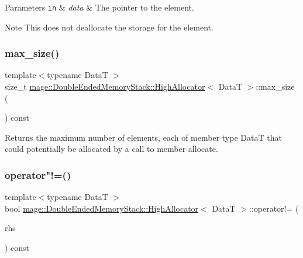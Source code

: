 \begin{DoxyParams}[1]{Parameters}
\mbox{\tt in}  & {\em data} & The pointer to the element. \\
\hline
\end{DoxyParams}
\begin{DoxyNote}{Note}
This does not deallocate the storage for the element. 
\end{DoxyNote}
\hypertarget{structmage_1_1_double_ended_memory_stack_1_1_high_allocator_a6adfd0ed341c637ce0d0edc9d3d02c27}{}\label{structmage_1_1_double_ended_memory_stack_1_1_high_allocator_a6adfd0ed341c637ce0d0edc9d3d02c27} 
\subsubsection{\texorpdfstring{max\+\_\+size()}{max\_size()}}
{\footnotesize\ttfamily template$<$typename DataT $>$ \\
size\+\_\+t \hyperlink{structmage_1_1_double_ended_memory_stack_1_1_high_allocator}{mage\+::\+Double\+Ended\+Memory\+Stack\+::\+High\+Allocator}$<$ DataT $>$\+::max\+\_\+size (\begin{DoxyParamCaption}{ }\end{DoxyParamCaption}) const\hspace{0.3cm}{\ttfamily [noexcept]}}

Returns the maximum number of elements, each of member type {\ttfamily DataT} that could potentially be allocated by a call to member allocate. \hypertarget{structmage_1_1_double_ended_memory_stack_1_1_high_allocator_a54019d2f65bcde7caf42dc507745e776}{}\label{structmage_1_1_double_ended_memory_stack_1_1_high_allocator_a54019d2f65bcde7caf42dc507745e776} 
\subsubsection{\texorpdfstring{operator"!=()}{operator!=()}}
{\footnotesize\ttfamily template$<$typename DataT $>$ \\
bool \hyperlink{structmage_1_1_double_ended_memory_stack_1_1_high_allocator}{mage\+::\+Double\+Ended\+Memory\+Stack\+::\+High\+Allocator}$<$ DataT $>$\+::operator!= (\begin{DoxyParamCaption}\item[{const \hyperlink{structmage_1_1_double_ended_memory_stack_1_1_high_allocator}{High\+Allocator}$<$ DataT $>$ \&}]{rhs }\end{DoxyParamCaption}) const\hspace{0.3cm}{\ttfamily [noexcept]}}

